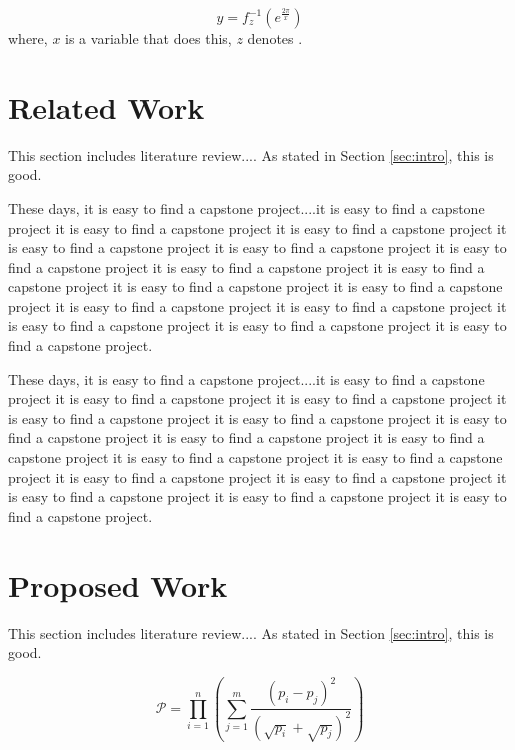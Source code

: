 \documentclass[11pt]{article}
\theoremstyle{plain}
\theoremstyle{definition}
\begin{document}
\begin{equation}\label{eqn:yofx}
 	y = f^{-1}_{z}(e^{\frac{2 \pi}{x}})    
\end{equation}
where, $x$ is a variable that does this, $z$ denotes \cite{Patil2019GeoSecureO}.

\section{Related Work}
\label{sec:relatedwork}
This section includes literature review.... As stated in Section \ref{sec:intro}, this is good.

These days, it is easy to find a capstone project....it is easy to find a capstone project it is easy to find a capstone project it is easy to find a capstone project it is easy to find a capstone project it is easy to find a capstone project it is easy to find a capstone project it is easy to find a capstone project it is easy to find a capstone project it is easy to find a capstone project it is easy to find a capstone project it is easy to find a capstone project it is easy to find a capstone project it is easy to find a capstone project it is easy to find a capstone project it is easy to find a capstone project.

These days, it is easy to find a capstone project....it is easy to find a capstone project it is easy to find a capstone project it is easy to find a capstone project it is easy to find a capstone project it is easy to find a capstone project it is easy to find a capstone project it is easy to find a capstone project it is easy to find a capstone project it is easy to find a capstone project it is easy to find a capstone project it is easy to find a capstone project it is easy to find a capstone project it is easy to find a capstone project it is easy to find a capstone project it is easy to find a capstone project.


\section{Proposed Work}
\label{sec:proposedwork}
This section includes literature review.... As stated in Section \ref{sec:intro}, this is good.

\begin{equation}\label{eqn:ydash}
 	\mathcal{P} = \prod_{i=1}^{n}(\sum_{j=1}^{m}\frac{(p_i - p_j)^2}{(\sqrt{p_i} + \sqrt{p_j})^2})  
\end{equation}
\end{document}
